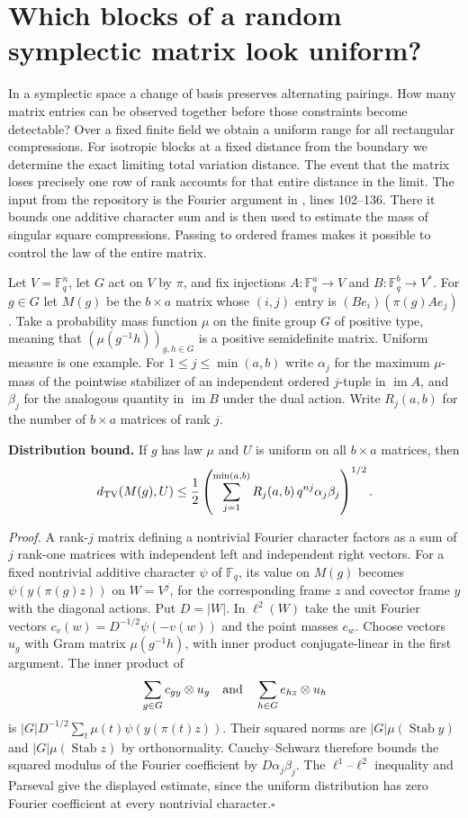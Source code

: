 \section{Which blocks of a random symplectic matrix look uniform?}

In a symplectic space a change of basis preserves alternating pairings. How many matrix entries can be observed together before those constraints become detectable? Over a fixed finite field we obtain a uniform range for all rectangular compressions. For isotropic blocks at a fixed distance from the boundary we determine the exact limiting total variation distance. The event that the matrix loses precisely one row of rank accounts for that entire distance in the limit. The input from the repository is the Fourier argument in , lines 102--136. There it bounds one additive character sum and is then used to estimate the mass of singular square compressions. Passing to ordered frames makes it possible to control the law of the entire matrix.

Let $V=\mathbb F_q^n$, let $G$ act on $V$ by $\pi$, and fix injections $A:\mathbb F_q^a\to V$ and $B:\mathbb F_q^b\to V^*$. For $g\in G$ let $M(g)$ be the $b\times a$ matrix whose $(i,j)$ entry is $(Be_i)(\pi(g)Ae_j)$. Take a probability mass function $\mu$ on the finite group $G$ of positive type, meaning that $(\mu(g^{-1}h))_{g,h\in G}$ is a positive semidefinite matrix. Uniform measure is one example. For $1\le j\le \min(a,b)$ write $\alpha_j$ for the maximum $\mu$-mass of the pointwise stabilizer of an independent ordered $j$-tuple in $\operatorname{im}A$, and $\beta_j$ for the analogous quantity in $\operatorname{im}B$ under the dual action. Write $R_j(a,b)$ for the number of $b\times a$ matrices of rank $j$.

\medskip\noindent\textbf{Distribution bound.}
If $g$ has law $\mu$ and $U$ is uniform on all $b\times a$ matrices, then
\[
 d_{\rm TV}(M(g),U)\le
 \frac12\left(\sum_{j=1}^{\min(a,b)} R_j(a,b)\, q^{nj}\alpha_j\beta_j\right)^{1/2}.
\]

\emph{Proof.}
A rank-$j$ matrix defining a nontrivial Fourier character factors as a sum of $j$ rank-one matrices with independent left and independent right vectors. For a fixed nontrivial additive character $\psi$ of $\mathbb F_q$, its value on $M(g)$ becomes $\psi(y(\pi(g)z))$ on $W=V^j$, for the corresponding frame $z$ and covector frame $y$ with the diagonal actions. Put $D=|W|$. In $\ell^2(W)$ take the unit Fourier vectors $c_v(w)=D^{-1/2}\psi(-v(w))$ and the point masses $e_w$. Choose vectors $u_g$ with Gram matrix $\mu(g^{-1}h)$, with inner product conjugate-linear in the first argument. The inner product of
\[
 \sum_{g\in G} c_{g y}\otimes u_g
       \quad\hbox{and}\quad
 \sum_{h\in G} e_{h z}\otimes u_h
\]
is $|G|D^{-1/2}\sum_t\mu(t)\psi(y(\pi(t)z))$.
Their squared norms are $|G|\mu(\operatorname{Stab}y)$ and $|G|\mu(\operatorname{Stab}z)$ by orthonormality. Cauchy--Schwarz therefore bounds the squared modulus of the Fourier coefficient by $D\alpha_j\beta_j$. The $\ell^1$--$\ell^2$ inequality and Parseval give the displayed estimate, since the uniform distribution has zero Fourier coefficient at every nontrivial character.\hfill$\square$

